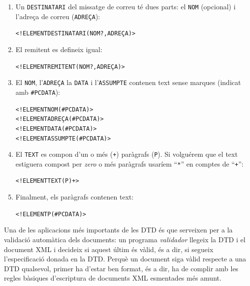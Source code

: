 \begin{enumerate}
\item Un \texttt{DESTINATARI} del missatge de correu té dues parts: el
  \texttt{NOM} (opcional) i l'adreça de correu (\texttt{ADREÇA}):
\begin{small}\begin{alltt}
<!ELEMENT DESTINATARI (NOM?, ADREÇA)>
\end{alltt}\end{small}
\item El remitent es defineix igual:
\begin{small}\begin{alltt}
<!ELEMENT REMITENT (NOM?, ADREÇA)>
\end{alltt}\end{small}
\item El \texttt{NOM}, l'\texttt{ADREÇA} la \texttt{DATA} i
l'\texttt{ASSUMPTE} contenen text sense marques (indicat amb
  \texttt{\#PCDATA}):
\begin{small}\begin{alltt}
<!ELEMENT NOM (#PCDATA)>
<!ELEMENT ADREÇA (#PCDATA)>
<!ELEMENT DATA (#PCDATA)>
<!ELEMENT ASSUMPTE (#PCDATA)>
\end{alltt}\end{small}

\item El \texttt{TEXT} es compon d'un o més (\texttt{+}) paràgrafs
  (\texttt{P}). Si volguérem que el text estiguera compost per
  \emph{zero} o més paràgrafs usaríem ``\texttt{*}'' en comptes de
  ``\texttt{+}'':
\begin{small}\begin{alltt}
<!ELEMENT TEXT (P)+>
\end{alltt}\end{small}

\item Finalment, els paràgrafs contenen text:
\begin{small}\begin{alltt}
<!ELEMENT P (#PCDATA)>
\end{alltt}\end{small}
\end{enumerate}

Una de les aplicacions més importants de les DTD és que serveixen per
a la validació automàtica dels documents: un programa \emph{validador}
llegeix la DTD i el document XML i decideix si aquest últim és vàlid,
és a dir, si segueix l'especificació donada en la DTD. Perquè un
document siga vàlid respecte a una DTD qualsevol, primer ha d'estar
ben format, és a dir, ha de complir amb les regles bàsiques
d'escriptura de documents XML esmentades més amunt.

